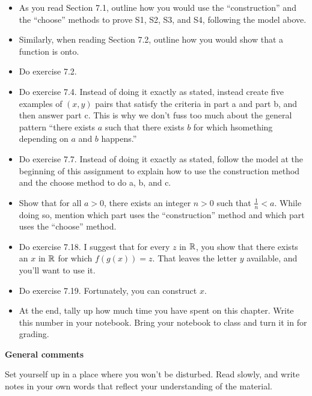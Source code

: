 \begin{itemize}
\item As you read Section 7.1, outline how you would use the ``construction'' and the ``choose'' methods to prove S1, S2, S3, and S4, following the model above.

\item Similarly, when reading Section 7.2, outline how you would show that a function is onto.

\item Do exercise 7.2.  

\item Do exercise 7.4.  Instead of doing it exactly as stated, instead create five examples of $(x,y)$ pairs that satisfy the criteria in part a and part b, and then answer part c.
This is why we don't fuss too much about the general pattern ``there exists $a$ such that there exists $b$ for which hsomething depending on $a$ and $b$ happens.''

\item Do exercise 7.7.  Instead of doing it exactly as stated, follow the model at the beginning of this assignment to explain how to use the construction method and the choose method to do a, b, and c.

\item Show that for all $a > 0$, there exists an integer $n > 0$ such that $\frac{1}{n} < a$.
While doing so, mention which part uses the ``construction'' method and which part uses the ``choose'' method.

\item Do exercise 7.18.
I suggest that for every $z$ in $\mathbb{R}$, you show that there exists an $x$ in $\mathbb{R}$ for which $f(g(x)) = z$.
That leaves the letter $y$ available, and you'll want to use it.

\item Do exercise 7.19.  Fortunately, you can construct $x$.

\item At the end, tally up how much time you have spent on this chapter.
Write this number in your notebook.
Bring your notebook to class and turn it in for grading.
\end{itemize}

\noindent
{\bf General comments}

Set yourself up in a place where you won't be disturbed.
Read slowly, and write notes in your own words that reflect your understanding of the material.
